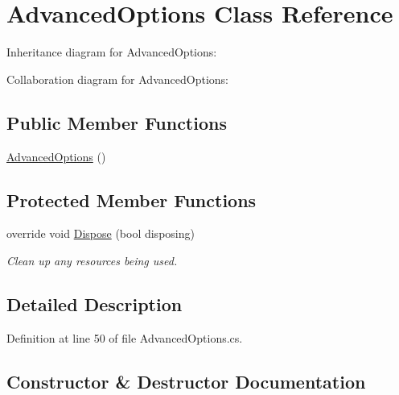 \hypertarget{class_m_p_f_s21_1_1_advanced_options}{}\section{Advanced\+Options Class Reference}
\label{class_m_p_f_s21_1_1_advanced_options}


Inheritance diagram for Advanced\+Options\+:


Collaboration diagram for Advanced\+Options\+:
\subsection*{Public Member Functions}
\begin{DoxyCompactItemize}
\item 
\hyperlink{class_m_p_f_s21_1_1_advanced_options_a25cdd6fb63937e3d7d36f24e9b2cd740}{Advanced\+Options} ()
\end{DoxyCompactItemize}
\subsection*{Protected Member Functions}
\begin{DoxyCompactItemize}
\item 
override void \hyperlink{class_m_p_f_s21_1_1_advanced_options_a849c3c7f8d08104f0cdb46bee9fe6389}{Dispose} (bool disposing)
\begin{DoxyCompactList}\small\item\em Clean up any resources being used. \end{DoxyCompactList}\end{DoxyCompactItemize}


\subsection{Detailed Description}


Definition at line 50 of file Advanced\+Options.\+cs.



\subsection{Constructor \& Destructor Documentation}
\hypertarget{class_m_p_f_s21_1_1_advanced_options_a25cdd6fb63937e3d7d36f24e9b2cd740}{}
